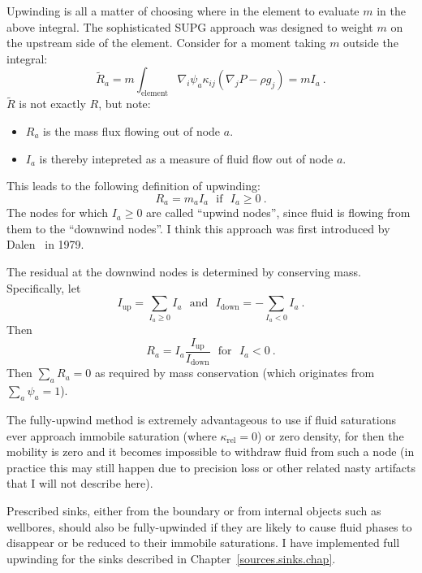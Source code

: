 \documentclass[]{scrreprt}
\begin{document}
Upwinding is all a matter of choosing where in the element to evaluate
$m$ in the above integral.  The sophisticated SUPG approach was
designed to weight $m$ on the upstream side of the element.  Consider
for a moment taking $m$ outside the integral:
\begin{equation}
\tilde{R}_{a} = m\int_{\mathrm{element}} \nabla_{i}\psi_{a}
\kappa_{ij}(\nabla_{j}P - \rho
g_{j}) = m I_{a} \ .
\end{equation}
$\tilde{R}$ is not exactly $R$, but note:
\begin{itemize}
\item $R_{a}$ is the mass flux flowing out of node $a$.
\item $I_{a}$ is thereby intepreted as a measure of fluid flow out of
  node $a$.
\end{itemize}
This leads to the following definition of upwinding:
\begin{equation}
R_{a} = m_{a}I_{a} \ \ \ \mbox{if}\ \ \ I_{a}\geq 0 \ .
\end{equation}
The nodes for which $I_{a}\geq 0$ are called ``upwind nodes'', since
fluid is flowing from them to the ``downwind nodes''.  I
think this approach was first introduced by Dalen~\cite{dalen1979} in
1979.

The residual at the downwind nodes is determined by conserving mass.
Specifically, let
\begin{equation}
I_{\mathrm{up}} = \sum_{I_{a}\geq 0}I_{a} \ \ \ \mbox{and}\ \ \ 
I_{\mathrm{down}} = -\sum_{I_{a}<0} I_{a} \ .
\end{equation}
Then
\begin{equation}
R_{a} = I_{a}\frac{I_{\mathrm{up}}}{I_{\mathrm{down}}}
\ \ \ \mbox{for}\ \ \ I_{a}<0 \ .
\end{equation}
Then $\sum_{a} R_{a} = 0$ as required by mass conservation (which
originates from $\sum_{a} \psi_{a} = 1$).

The fully-upwind method is extremely
advantageous to use if fluid saturations ever approach immobile
saturation (where $\kappa_{\mathrm{rel}}=0$) or zero density, for then
the mobility is zero and it becomes impossible to withdraw fluid from
such a node (in practice this may still happen due to precision loss
or other related nasty artifacts that I will not describe here).

Prescribed sinks, either from the boundary or from internal objects such as
wellbores, should also be fully-upwinded if they are likely to cause
fluid phases to disappear or be reduced to their immobile
saturations.  I have implemented full upwinding for the sinks
described in Chapter~\ref{sources.sinks.chap}.
\end{document}
